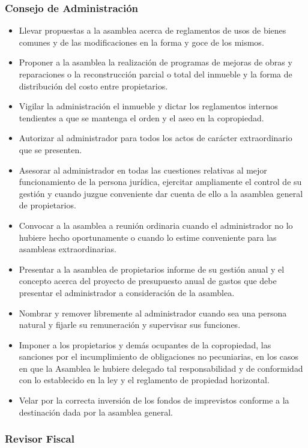 \subsubsection{Consejo de Administración}
\begin{itemize}
\item Llevar propuestas a la asamblea acerca de reglamentos de usos de bienes comunes y de las modificaciones en la forma y goce de los mismos.
\item Proponer a la asamblea la realización de programas de mejoras de obras y reparaciones o la reconstrucción parcial o total del inmueble y la forma de distribución del costo entre propietarios.
\item Vigilar la administración el inmueble y dictar los reglamentos internos tendientes a que se mantenga el orden y el aseo en la copropiedad.
\item Autorizar al administrador para todos los actos de carácter extraordinario que se presenten.
\item Asesorar al administrador en todas las cuestiones relativas al mejor funcionamiento de la persona jurídica, ejercitar ampliamente el control de su gestión y cuando juzgue conveniente dar cuenta de ello a la asamblea general de propietarios.
\item Convocar a la asamblea a reunión ordinaria cuando el administrador no lo hubiere hecho oportunamente o cuando lo estime conveniente para las asambleas extraordinarias.
\item Presentar a la asamblea de propietarios informe de su gestión anual y el concepto acerca del proyecto de presupuesto anual de gastos que debe presentar el administrador a consideración de la asamblea.
\item Nombrar y remover libremente al administrador cuando sea una persona natural y fijarle su remuneración y supervisar sus funciones.
\item Imponer a los propietarios y demás ocupantes de la copropiedad, las sanciones por el incumplimiento de obligaciones no pecuniarias, en los casos en que la Asamblea le hubiere delegado tal responsabilidad y de conformidad con lo establecido en la ley y el reglamento de propiedad horizontal.
\item Velar por la correcta inversión de los fondos de imprevistos conforme a la destinación dada por la asamblea general.

\end{itemize}

\subsubsection{Revisor Fiscal}

